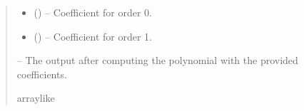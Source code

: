 \documentclass[letterpaper,11pt,english]{sphinxmanual}
\begin{document}
\begin{savenotes}
\begin{fulllineitems}
\begin{savenotes}
\begin{fulllineitems}
\begin{quote}
\begin{description}
\begin{itemize}
\item {} 
\sphinxAtStartPar
{} () – Coefficient for order 0.

\item {} 
\sphinxAtStartPar
{} () – Coefficient for order 1.

\end{itemize}

\sphinxAtStartPar
{} – The output after computing the polynomial with the provided
coefficients.

\sphinxAtStartPar
array\sphinxhyphen{}like

\end{description}\end{quote}

\end{fulllineitems}\end{savenotes}



\end{fulllineitems}
\end{savenotes}
\end{document}
